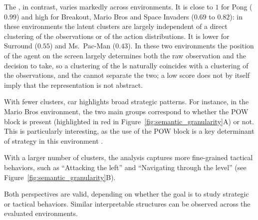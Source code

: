 The \AbstractionScoreName, in contrast, varies markedly across environments.
It is close to $1$ for Pong ($0.99$) and high for Breakout, Mario Bros and Space Invaders ($0.69$ to $0.82$): in these environments the latent clusters are largely independent of a direct clustering of the observations or of the action distributions.
It is lower for Surround ($0.55$) and Ms.\ Pac-Man ($0.43$).
In these two environments the position of the agent on the screen largely determines both the raw observation and the decision to take, so a clustering of the \gls{ls} naturally coincides with a clustering of the observations, and the \AbstractionScoreName cannot separate the two; a low score does not by itself imply that the representation is not abstract.



With fewer clusters, \gls{car} highlights broad strategic patterns.
For instance, in the Mario Bros environment, the two main groups correspond to whether the POW block is present (highlighted in red in Figure~\ref{fig:semantic_granularity}A) or not.
This is particularly interesting, as the use of the POW block is a key determinant of strategy in this environment \cite{mario_bros_atari_2600}.

With a larger number of clusters, the analysis captures more fine-grained tactical behaviors, such as ``Attacking the left'' and ``Navigating through the level'' (see Figure~\ref{fig:semantic_granularity}B).

Both perspectives are valid, depending on whether the goal is to study strategic or tactical behaviors.
Similar interpretable structures can be observed across the evaluated environments.

